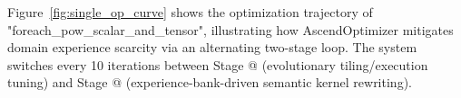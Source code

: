 \documentclass{article}
\makeatletter
\theoremstyle{plain}
\theoremstyle{definition}
\theoremstyle{remark}
\newcommand{\Rmnum}[1]{\expandafter\@slowromancap\romannumeral #1@}
\makeatother
\begin{document}









Figure~\ref{fig:single_op_curve} shows the optimization trajectory of "foreach\_pow\_scalar\_and\_tensor", illustrating how AscendOptimizer mitigates domain experience scarcity via an alternating two-stage loop.
The system switches every 10 iterations between Stage \Rmnum{1} (evolutionary tiling/execution tuning) and Stage \Rmnum{2} (experience-bank-driven semantic kernel rewriting).
\end{document}
